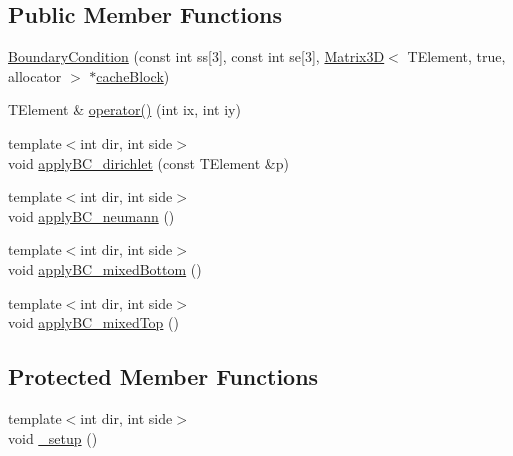 \subsection*{Public Member Functions}
\begin{DoxyCompactItemize}
\item 
\hyperlink{class_boundary_condition_a89cbd322bff8127af5a49685e3bf04ce}{Boundary\+Condition} (const int ss\mbox{[}3\mbox{]}, const int se\mbox{[}3\mbox{]}, \hyperlink{class_matrix3_d}{Matrix3\+D}$<$ T\+Element, true, allocator $>$ $\ast$\hyperlink{class_boundary_condition_a1e0c33fa794a6d333d4451f8fde04c29}{cache\+Block})
\item 
T\+Element \& \hyperlink{class_boundary_condition_aadcfe05da7761b68191835b09d4d2cf0}{operator()} (int ix, int iy)
\item 
{\footnotesize template$<$int dir, int side$>$ }\\void \hyperlink{class_boundary_condition_adadad3f69ee5cf8ab11dc8f8a7763a4f}{apply\+B\+C\+\_\+dirichlet} (const T\+Element \&p)
\item 
{\footnotesize template$<$int dir, int side$>$ }\\void \hyperlink{class_boundary_condition_a101992951fb756135ca3e44f5d64bb60}{apply\+B\+C\+\_\+neumann} ()
\item 
{\footnotesize template$<$int dir, int side$>$ }\\void \hyperlink{class_boundary_condition_a60e154d33104f42e29dfa49061b266f6}{apply\+B\+C\+\_\+mixed\+Bottom} ()
\item 
{\footnotesize template$<$int dir, int side$>$ }\\void \hyperlink{class_boundary_condition_a77cf65bd542d198d80aa54a3de632ff5}{apply\+B\+C\+\_\+mixed\+Top} ()
\end{DoxyCompactItemize}
\subsection*{Protected Member Functions}
\begin{DoxyCompactItemize}
\item 
{\footnotesize template$<$int dir, int side$>$ }\\void \hyperlink{class_boundary_condition_af8969c6c584388f44cf464a8021d125a}{\+\_\+setup} ()
\end{DoxyCompactItemize}
